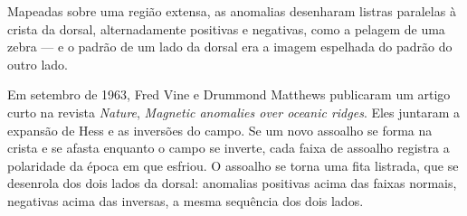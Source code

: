Mapeadas sobre uma região extensa, as anomalias desenharam listras
paralelas à crista da dorsal, alternadamente positivas e negativas, como a
pelagem de uma zebra --- e o padrão de um lado da dorsal era a imagem
espelhada do padrão do outro lado.

\begin{history}
Em setembro de 1963, Fred Vine e Drummond Matthews publicaram um artigo
curto na revista \emph{Nature}, \emph{Magnetic anomalies over oceanic
ridges}. Eles juntaram a expansão de Hess e as inversões do campo. Se um
novo assoalho se forma na crista e se afasta enquanto o campo se inverte,
cada faixa de assoalho registra a polaridade da época em que esfriou. O
assoalho se torna uma fita listrada, que se desenrola dos dois lados da
dorsal: anomalias positivas acima das faixas normais, negativas acima das
inversas, a mesma sequência dos dois lados.
\end{history}

